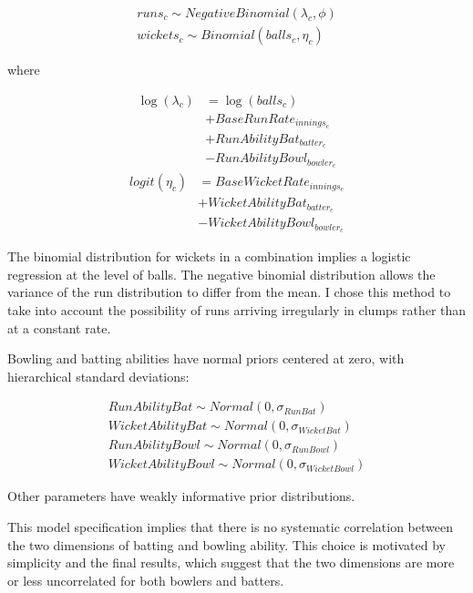 \documentclass[11pt]{article}
\begin{document}
\begin{gather}
\nonumber runs_{c} \sim NegativeBinomial(\lambda_{c}, \phi) \\ \nonumber
wickets_{c} \sim Binomial(balls_c, \eta_{c}) 
\end{gather}

where

\begin{align}
\nonumber\log(\lambda_{c}) &= \log(balls_{c}) \\ \nonumber &+
BaseRunRate_{innings_c} \\ \nonumber &+ RunAbilityBat_{batter_c} \\ \nonumber &-
RunAbilityBowl_{bowler_c} \end{align}
\begin{align}
\nonumber logit(\eta_{c}) &= BaseWicketRate_{innings_c} \\ \nonumber &+
WicketAbilityBat_{batter_c} \\ \nonumber &- WicketAbilityBowl_{bowler_c}
\end{align}

The binomial distribution for wickets in a combination implies a
logistic regression at the level of balls. The negative binomial
distribution allows the variance of the run distribution to differ
from the mean. I chose this method to take into account the
possibility of runs arriving irregularly in clumps rather than at a
constant rate.

Bowling and batting abilities have normal priors centered at zero, with
hierarchical standard deviations:

\begin{align}
\nonumber RunAbilityBat \sim Normal(0, \sigma_{RunBat}) \\ \nonumber
WicketAbilityBat \sim Normal(0, \sigma_{WicketBat}) \\ \nonumber RunAbilityBowl
\sim Normal(0, \sigma_{RunBowl}) \\ \nonumber WicketAbilityBowl \sim Normal(0,
\sigma_{WicketBowl}) \end{align}

Other parameters have weakly informative prior distributions.

This model specification implies that there is no systematic
correlation between the two dimensions of batting and bowling
ability. This choice is motivated by simplicity and the final results,
which suggest that the two dimensions are more or less uncorrelated
for both bowlers and batters.
\end{document}
